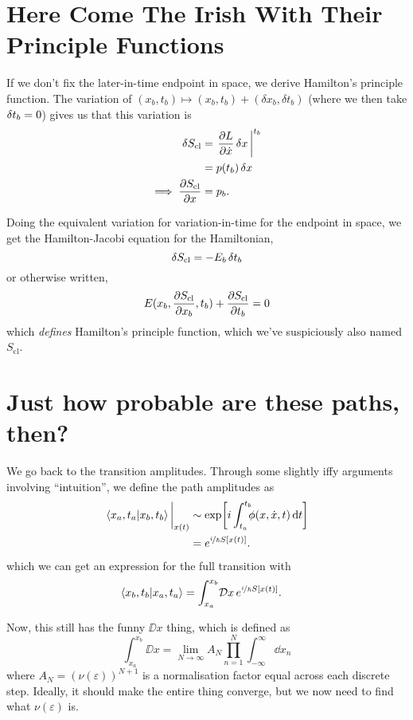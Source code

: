 \documentclass[]{revision-notes}
\begin{document}
\section{Here Come The Irish With Their Principle Functions}
If we don't fix the later-in-time endpoint in space, we derive Hamilton's principle function.
The variation of \( (x_b, t_b) \mapsto (x_b, t_b) + (\delta x_b, \delta t_b)\) (where we then take \(\variation{t_b} = 0\)) gives us that this variation is \begin{align*}
  \variation{S_{\mathrm{cl}}} &= \eval{\pdv{L}{\dot{x}}\variation{x}}^{t_b}\\
  &= p(t_b)\variation{x}\\
  \implies \pdv{S_{\mathrm{cl}}}{x} &= p_b.
\end{align*}

Doing the equivalent variation for variation-in-time for the endpoint in space, we get the Hamilton-Jacobi equation for the Hamiltonian, \[\variation{S_{\mathrm{cl}} = - E_b \variation{t_b}}\] or otherwise written,
\[E(x_b, \pdv{S_{\mathrm{cl}}}{x_b}, t_b) + \pdv{S_{\mathrm{cl}}}{t_b} = 0\] which \emph{defines} Hamilton's principle function, which we've suspiciously also named \(S_{\mathrm{cl}}\).

\section{Just how probable are these paths, then?}
We go back to the transition amplitudes.
Through some slightly iffy arguments involving ``intuition'', we define the path amplitudes as
\begin{align*}
  \eval{\braket{x_a, t_a}{x_b, t_b}}_{x(t)} &\sim \exp[i\int_{t_a}^{t_b} \!\!\!\phi(x, \dot x, t) \dd{t}]\\
  &= e^{\nicefrac{i}{\hbar} S[x(t)]}.
\end{align*}
which we can get an expression for the full transition with
\begin{align*}
  \braket{x_b, t_b}{x_a, t_a} &= \int_{x_a}^{x_b}\!\mathcal{D} x\, e^{\nicefrac{i}{\hbar} S[x(t)]}.
\end{align*}

Now, this still has the funny \(\DD{x}\) thing, which is defined as
\[\int_{x_a}^{x_b}\!\DD{x} = \lim_{N\to \infty} A_N \prod_{n=1}^N \int_{-\infty}^{\infty} \dd{x_{n}} \] where \(A_N = (\nu(\varepsilon))^{N+1}\) is a normalisation factor equal across each discrete step.
Ideally, it should make the entire thing converge, but we now need to find what \(\nu(\varepsilon)\) is.
\end{document}
